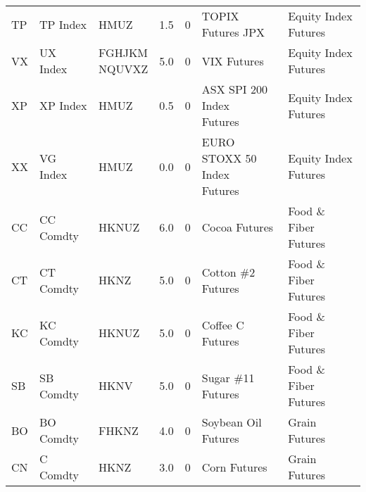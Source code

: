 \begin{longtable}{lllrrll}
                   TP &               TP Index &                      HMUZ &                               1.5 &                        0 &                                          TOPIX Futures JPX &    Equity Index Futures \\
                   VX &               UX Index & \makecell{FGHJKM\\NQUVXZ} &                               5.0 &                        0 &                                                VIX Futures &    Equity Index Futures \\
                   XP &               XP Index &                      HMUZ &                               0.5 &                        0 &                      \makecell{ASX SPI 200 Index\\Futures} &    Equity Index Futures \\
                   XX &               VG Index &                      HMUZ &                               0.0 &                        0 &                    \makecell{EURO STOXX 50 Index\\Futures} &    Equity Index Futures \\
                   CC &              CC Comdty &                     HKNUZ &                               6.0 &                        0 &                                              Cocoa Futures &   Food \& Fiber Futures \\
                   CT &              CT Comdty &                      HKNZ &                               5.0 &                        0 &                                         Cotton \#2 Futures &   Food \& Fiber Futures \\
                   KC &              KC Comdty &                     HKNUZ &                               5.0 &                        0 &                                           Coffee C Futures &   Food \& Fiber Futures \\
                   SB &              SB Comdty &                      HKNV &                               5.0 &                        0 &                                         Sugar \#11 Futures &   Food \& Fiber Futures \\
                   BO &              BO Comdty &                     FHKNZ &                               4.0 &                        0 &                                        Soybean Oil Futures &           Grain Futures \\
                   CN &               C Comdty &                      HKNZ &                               3.0 &                        0 &                                               Corn Futures &           Grain Futures \\

\end{longtable}
